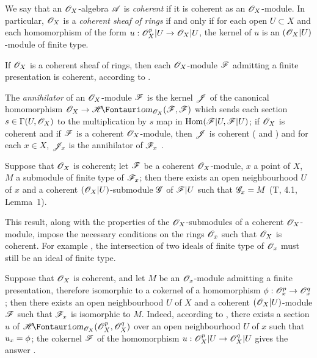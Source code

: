 \begin{env}[5.3.7]
\label{0.5.3.7}
We say that an $\mathscr{O}_X$-algebra $\mathscr{A}$ is \emph{coherent} if it is coherent as an $\mathscr{O}_X$-module.
In particular, $\mathscr{O}_X$ is a \emph{coherent sheaf of rings} if and only if for each open $U\subset X$ and each homomorphism of the form $u:\sh{O}_X^p|U\to\sh{O}_X|U$, the kernel of $u$ is an $(\mathscr{O}_X|U)$-module of finite type.

If $\mathscr{O}_X$ is a coherent sheaf of rings, then each $\mathscr{O}_X$-module $\mathscr{F}$ admitting a finite presentation  is coherent, according to .

The \emph{annihilator} of an $\mathscr{O}_X$-module $\mathscr{F}$ is the kernel $\mathscr{J}$ of the canonical homomorphism $\sh{O}_X\to\shHom_{\sh{O}_X}(\sh{F},\sh{F})$ which sends each section $s\in\Gamma(U,\mathscr{O}_X)$ to the multiplication by $s$ map in $\operatorname{Hom}(\mathscr{F}|U,\mathscr{F}|U)$;
if $\mathscr{O}_X$ is coherent and if $\mathscr{F}$ is a coherent $\mathscr{O}_X$-module, then $\mathscr{J}$ is coherent ( and ) and for each $x\in X$, $\mathscr{J}_x$ is the annihilator of $\mathscr{F}_x$ .
\end{env}

\begin{env}[5.3.8]
\label{0.5.3.8}
Suppose that $\mathscr{O}_X$ is coherent;
let $\mathscr{F}$ be a coherent $\mathscr{O}_X$-module, $x$ a point of $X$, $M$ a submodule of finite type of $\mathscr{F}_x$;
then there exists an open neighbourhood $U$ of $x$ and a coherent $(\mathscr{O}_X|U)$-submodule $\mathscr{G}$ of $\mathscr{F}|U$ such that $\mathscr{G}_x=M$ (T, 4.1, Lemma~1).

This result, along with the properties of the $\mathscr{O}_X$-submodules of a coherent $\mathscr{O}_X$-module, impose the necessary conditions on the rings $\mathscr{O}_x$ such that $\mathscr{O}_X$ is coherent.
For example , the intersection of two ideals of finite type of $\mathscr{O}_x$ must still be an ideal of finite type.
\end{env}

\begin{env}[5.3.9]
\label{0.5.3.9}
Suppose that $\mathscr{O}_X$ is coherent, and let $M$ be an $\mathscr{O}_x$-module admitting a finite presentation, therefore isomorphic to a cokernel of a homomorphism $\vphi:\sh{O}_x^p\to\sh{O}_x^q$;
then there exists an open neighbourhood $U$ of $X$ and a coherent $(\mathscr{O}_X|U)$-module $\mathscr{F}$ such that $\mathscr{F}_x$ is isomorphic to $M$.
Indeed, according to , there exists a section $u$ of $\shHom_{\sh{O}_X}(\sh{O}_X^p,\sh{O}_X^q)$ over an open neighbourhood $U$ of $x$ such that $u_x=\phi$;
the cokernel $\mathscr{F}$ of the homomorphism $u:\sh{O}_X^p|U\to\sh{O}_X^q|U$ gives the answer .
\end{env}

